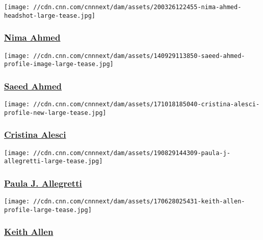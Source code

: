 \href{/profiles/nima-ahmed-profile}{}

\texttt{[image: //cdn.cnn.com/cnnnext/dam/assets/200326122455-nima-ahmed-headshot-large-tease.jpg]}

\hypertarget{nima-ahmed}{%
\subsubsection{\texorpdfstring{\href{/profiles/nima-ahmed-profile}{Nima
Ahmed}}{Nima Ahmed}}\label{nima-ahmed}}

\href{/profiles/saeed-ahmed}{}

\texttt{[image: //cdn.cnn.com/cnnnext/dam/assets/140929113850-saeed-ahmed-profile-image-large-tease.jpg]}

\hypertarget{saeed-ahmed}{%
\subsubsection{\texorpdfstring{\href{/profiles/saeed-ahmed}{Saeed
Ahmed}}{Saeed Ahmed}}\label{saeed-ahmed}}

\href{/profiles/cristina-alesci-profile}{}

\texttt{[image: //cdn.cnn.com/cnnnext/dam/assets/171018185040-cristina-alesci-profile-new-large-tease.jpg]}

\hypertarget{cristina-alesci}{%
\subsubsection{\texorpdfstring{\href{/profiles/cristina-alesci-profile}{Cristina
Alesci}}{Cristina Alesci}}\label{cristina-alesci}}

\href{/profiles/paula-j-allegretti}{}

\texttt{[image: //cdn.cnn.com/cnnnext/dam/assets/190829144309-paula-j-allegretti-large-tease.jpg]}

\hypertarget{paula-j-allegretti}{%
\subsubsection{\texorpdfstring{\href{/profiles/paula-j-allegretti}{Paula
J. Allegretti}}{Paula J. Allegretti}}\label{paula-j-allegretti}}

\href{/profiles/keith-allen}{}

\texttt{[image: //cdn.cnn.com/cnnnext/dam/assets/170628025431-keith-allen-profile-large-tease.jpg]}

\hypertarget{keith-allen}{%
\subsubsection{\texorpdfstring{\href{/profiles/keith-allen}{Keith
Allen}}{Keith Allen}}\label{keith-allen}}

